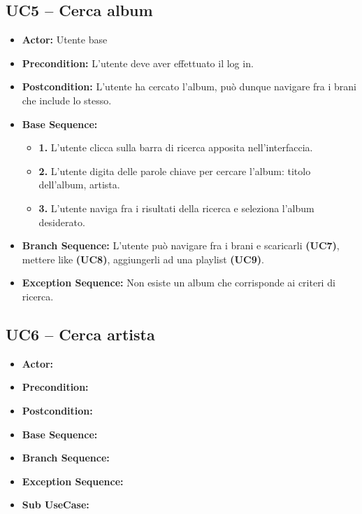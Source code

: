 \subsection{\textbf{UC5 -- Cerca album}}
\begin{itemize}
    \item \textbf{Actor:} Utente base
    \item \textbf{Precondition:} L'utente deve aver effettuato il log in.
    \item \textbf{Postcondition:} L'utente ha cercato l'album, può dunque navigare fra i brani che include lo stesso.
    \item \textbf{Base Sequence:}
    \begin{itemize}
        \item \textbf{1.} L'utente clicca sulla barra di ricerca apposita nell'interfaccia.
        \item \textbf{2.} L'utente digita delle parole chiave per cercare l'album: titolo dell'album, artista.
        \item \textbf{3.} L'utente naviga fra i risultati della ricerca e seleziona l'album desiderato.
    \end{itemize}
    \item \textbf{Branch Sequence:} L'utente può navigare fra i brani e scaricarli \textbf{(UC7)}, mettere like \textbf{(UC8)}, aggiungerli ad una playlist \textbf{(UC9)}.
    \item \textbf{Exception Sequence:} Non esiste un album che corrisponde ai criteri di ricerca.

\end{itemize}

\subsection{\textbf{UC6 -- Cerca artista}}
\begin{itemize}
    \item \textbf{Actor:}
    \item \textbf{Precondition:}
    \item \textbf{Postcondition:}
    \item \textbf{Base Sequence:}
    \item \textbf{Branch Sequence:}
    \item \textbf{Exception Sequence:}
    \item \textbf{Sub UseCase:}

\end{itemize}

